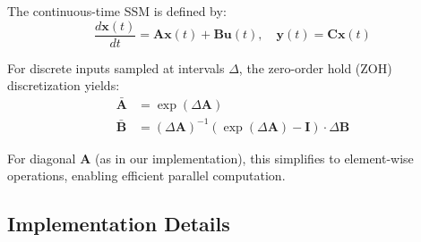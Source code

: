 \documentclass{article}
\theoremstyle{definition}
\theoremstyle{remark}
\begin{document}
The continuous-time SSM is defined by:
\begin{equation}
\frac{d\mathbf{x}(t)}{dt} = \mathbf{A}\mathbf{x}(t) + \mathbf{B}\mathbf{u}(t), \quad \mathbf{y}(t) = \mathbf{C}\mathbf{x}(t)
\end{equation}

For discrete inputs sampled at intervals $\Delta$, the zero-order hold (ZOH) discretization yields:
\begin{align}
\bar{\mathbf{A}} &= \exp(\Delta \mathbf{A}) \\
\bar{\mathbf{B}} &= (\Delta \mathbf{A})^{-1}(\exp(\Delta \mathbf{A}) - \mathbf{I}) \cdot \Delta \mathbf{B}
\end{align}

For diagonal $\mathbf{A}$ (as in our implementation), this simplifies to element-wise operations, enabling efficient parallel computation.

\subsection{Implementation Details}
\end{document}
